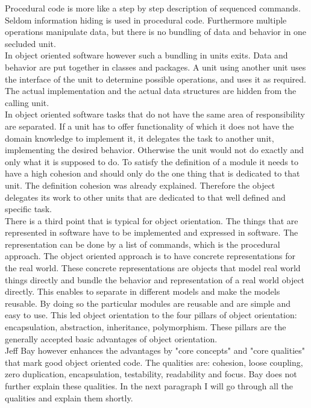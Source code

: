 Procedural code is more like a step by step description of sequenced commands. 	Seldom information hiding is used in procedural code. Furthermore multiple operations manipulate data, but there is no bundling of data and behavior in one secluded unit. \\

In object oriented software however such a bundling in units exits. Data and behavior are put together in classes and packages. A unit using another unit uses the interface of the unit to determine possible operations, and uses it as required. The actual implementation and the actual data structures are hidden from the calling unit.\\
 
In object oriented software tasks that do not have the same area of responsibility are separated. If a unit has to offer functionality of which it does not have the domain knowledge to implement it, it delegates the task to another unit, implementing the desired behavior. Otherwise the unit would not do exactly and only what it is supposed to do. To satisfy the definition of a module it needs to have a high cohesion and should only do the one thing that is dedicated to that unit. The definition cohesion was already explained. Therefore the object delegates its work to other units that are dedicated to that well defined and specific task. \\
There is a third point that is typical for object orientation. The things that are represented in software have to be implemented and expressed in software. The representation can be done by a list of commands, which is the procedural approach. The object oriented approach is to have concrete representations for the real world. These concrete representations are objects that model real world things directly and bundle the behavior and representation of a real world object directly. 
This enables to separate in different models and make the models reusable. By doing so the particular modules are reusable and are simple and easy to use. 
This led object orientation to the four pillars of object orientation: encapsulation, abstraction, inheritance, polymorphism. These pillars are the generally accepted basic advantages of object orientation. \\

Jeff Bay however enhances the advantages by "core concepts" and "core qualities" that mark good object oriented code. The qualities are: cohesion, loose coupling, zero duplication, encapsulation, testability, readability and focus.
Bay does not further explain these qualities. In the next paragraph I will go through all the qualities and explain them shortly. \\

